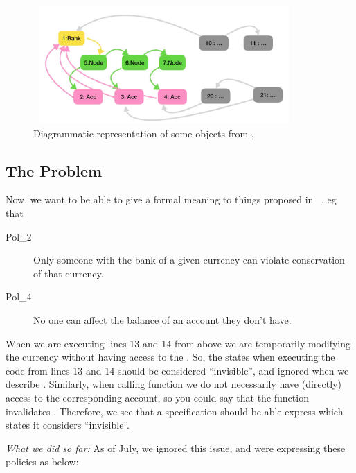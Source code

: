 \documentclass[acmsmall,screen]{acmart}
\begin{document}
\begin{figure}[btph]
\includegraphics[width=10cm,height=4.5cm]{diagram1}
 \caption{Diagrammatic representation of some objects from  ,  \etc  }
  \label{fig:Diagram}
  \end{figure}


\subsection{The Problem}

Now, we want to be able to give a formal meaning to things proposed in ~\cite{ELang}. eg that   

 
\begin{description}
\item[Pol\_2]
Only someone with the bank of a given currency can violate conservation of that currency.
 \item[Pol\_4]
No one can affect the balance of an account they don't have.
\end{description}

When we are executing lines 13 and 14 from above we are temporarily modifying the currency without having access to the . So, the states when executing the code from lines 13 and 14  should be considered ``invisible'', and ignored when we describe {}. Similarly, when calling
function  we do not necessarily have (directly) access to  the corresponding account,
so you could say that the function  invalidates {}.
Therefore, we see that a specification should be able express which states it considers  ``invisible''.


\noindent  
{\em What we did so far:} 
As of July, we ignored this issue, and were expressing these policies as below:
\end{document}
